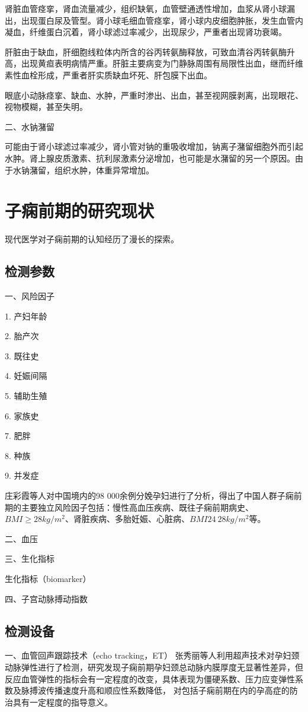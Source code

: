 肾脏血管痉挛，肾血流量减少，组织缺氧，血管壁通透性增加，血浆从肾小球漏出，出现蛋白尿及管型。肾小球毛细血管痉挛，肾小球内皮细胞肿胀，发生血管内凝血，纤维蛋白沉着，肾小球滤过率减少，出现尿少，严重者出现肾功衰竭。

肝脏由于缺血，肝细胞线粒体内所含的谷丙转氨酶释放，可致血清谷丙转氨酶升高，出现黄疸表明病情严重。肝脏主要病变为门静脉周围有局限性出血，继而纤维素性血栓形成，严重者肝实质缺血坏死、肝包膜下出血。

眼底小动脉痉挛、缺血、水肿，严重时渗出、出血，甚至视网膜剥离，出现眼花、视物模糊，甚至失明。

二、水钠潴留　

可能由于肾小球滤过率减少，肾小管对钠的重吸收增加，钠离子潴留细胞外而引起水肿。肾上腺皮质激素、抗利尿激素分泌增加，也可能是水潴留的另一个原因。由于水钠潴留，组织水肿，体重异常增加。

\section{子痫前期的研究现状}
现代医学对子痫前期的认知经历了漫长的探索\cite{BJOG2016}。
\subsection{检测参数}
一、风险因子

1. 产妇年龄

2. 胎产次

3. 既往史

4. 妊娠间隔

5. 辅助生殖

6. 家族史

7. 肥胖

8. 种族

9. 并发症

庄彩霞等人\cite{Zhuang2019}对中国境内的98 000余例分娩孕妇进行了分析，得出了中国人群子痫前期的主要独立风险因子包括：慢性高血压疾病、既往子痫前期病史、$BMI≥28kg/m^2$、肾脏疾病、多胎妊娠、心脏病、$BMI 24~28kg/m^2$等。

二、血压

三、生化指标

生化指标（biomarker）

四、子宫动脉搏动指数




\subsection{检测设备}
一、血管回声跟踪技术（echo tracking，ET）
张秀丽等人\cite{Zhang2014}利用超声技术对孕妇颈动脉弹性进行了检测，研究发现子痫前期孕妇颈总动脉内膜厚度无显著性差异，但反应血管弹性的指标会有一定程度的改变，具体表现为僵硬系数、压力应变弹性系数及脉搏波传播速度升高和顺应性系数降低，
对包括子痫前期在内的孕高症的防治具有一定程度的指导意义。

